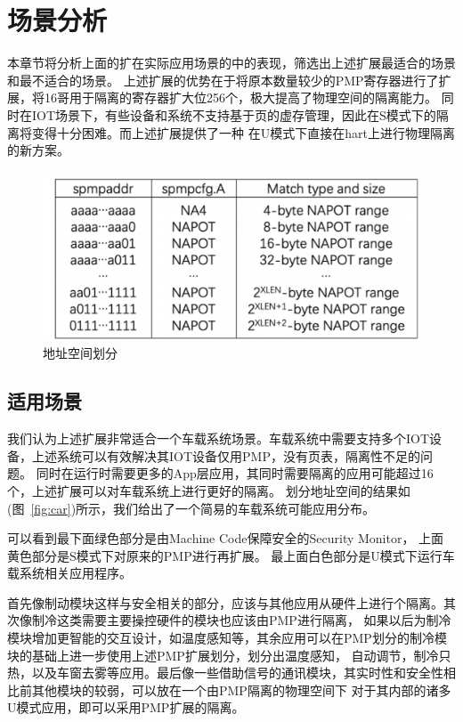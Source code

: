 \section{场景分析}
本章节将分析上面的扩在实际应用场景的中的表现，筛选出上述扩展最适合的场景和最不适合的场景。
上述扩展的优势在于将原本数量较少的PMP寄存器进行了扩展，将16哥用于隔离的寄存器扩大位256个，极大提高了物理空间的隔离能力。
同时在IOT场景下，有些设备和系统不支持基于页的虚存管理，因此在S模式下的隔离将变得十分困难。而上述扩展提供了一种
在U模式下直接在hart上进行物理隔离的新方案。

\begin{figure}
    \centering
    \includegraphics[scale=0.35]{Figures/extend/address.png}
    \decoRule
    \caption{地址空间划分}
    \label{fig:address}
\end{figure}

\subsection{适用场景}
我们认为上述扩展非常适合一个车载系统场景。车载系统中需要支持多个IOT设备，上述系统可以有效解决其IOT设备仅用PMP，没有页表，隔离性不足的问题。
同时在运行时需要更多的App层应用，其同时需要隔离的应用可能超过16个，上述扩展可以对车载系统上进行更好的隔离。
划分地址空间的结果如(图~\ref{fig:car})所示，我们给出了一个简易的车载系统可能应用分布。


可以看到最下面绿色部分是由Machine Code保障安全的Security Monitor， 
上面黄色部分是S模式下对原来的PMP进行再扩展。
最上面白色部分是U模式下运行车载系统相关应用程序。

首先像制动模块这样与安全相关的部分，应该与其他应用从硬件上进行个隔离。其次像制冷这类需要主要操控硬件的模块也应该由PMP进行隔离，
如果以后为制冷模块增加更智能的交互设计，如温度感知等，其余应用可以在PMP划分的制冷模块的基础上进一步使用上述PMP扩展划分，划分出温度感知，
自动调节，制冷只热，以及车窗去雾等应用。最后像一些借助信号的通讯模块，其实时性和安全性相比前其他模块的较弱，可以放在一个由PMP隔离的物理空间下
对于其内部的诸多U模式应用，即可以采用PMP扩展的隔离。

